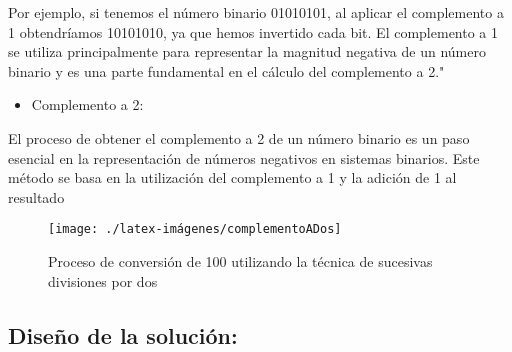 Por ejemplo, si tenemos el número binario 01010101, al aplicar el complemento a 1 obtendríamos 10101010, ya que hemos invertido cada bit. El complemento a 1 se utiliza principalmente para representar la magnitud negativa de un número binario y es una parte fundamental en el cálculo del complemento a 2."
\newline

\begin{itemize}
    \item Complemento a 2:
\end{itemize}
El proceso de obtener el complemento a 2 de un número binario es un paso esencial en la representación de números negativos en sistemas binarios. Este método se basa en la utilización del complemento a 1 y la adición de 1 al resultado
\newline

\begin{figure}
\centerline{\texttt{[image: ./latex-imágenes/complementoADos]}}
\caption{Proceso de conversión de 100 utilizando la técnica de sucesivas divisiones por dos}
\vspace*{-5pt}
\label{fig:dos}
\end{figure}

\subsection{\textbf{Diseño de la solución:}}

